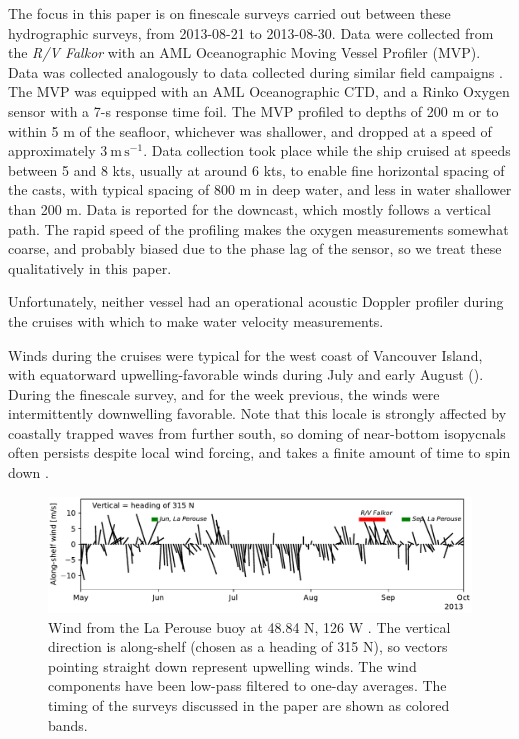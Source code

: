 \documentclass[draft]{agujournal2019}
\begin{document}
The focus in this paper is on finescale surveys carried out between these hydrographic surveys, from 2013-08-21 to 2013-08-30.  Data were collected from the \emph{R/V Falkor} with an AML Oceanographic Moving Vessel Profiler (MVP).  Data was collected analogously to data collected during similar field campaigns \cite{klymaketal15a, klymaketal16, dasaroetal18}. The MVP was equipped with an AML Oceanographic CTD, and a Rinko Oxygen sensor with a 7-s response time foil.  The MVP profiled to depths of 200 m or to within 5 m of the seafloor, whichever was shallower, and dropped at a speed of approximately $3\ \mathrm{m\,s^{-1}}$.  Data collection took place while the ship cruised at speeds between 5 and 8 kts, usually at around 6 kts, to enable fine horizontal spacing of the casts, with typical spacing  of 800 m in deep water, and less in water shallower than 200 m.  Data is reported for the downcast, which mostly follows a vertical path.  The rapid speed of the profiling makes the oxygen measurements somewhat coarse, and probably biased due to the phase lag of the sensor, so we treat these qualitatively in this paper.

Unfortunately, neither vessel had an operational acoustic Doppler profiler during the cruises with which to make water velocity measurements.

Winds during the cruises were typical for the west coast of Vancouver Island, with equatorward upwelling-favorable winds during July and early August ().  During the finescale survey, and for the week previous, the winds were intermittently downwelling favorable.  Note that this locale is strongly affected by coastally trapped waves from further south, so doming of near-bottom isopycnals often persists despite local wind forcing, and takes a finite amount of time to spin down \cite{thomsonkrassovski15, engidaetal16}.

\begin{figure}[htbp]
  \begin{center}
    \includegraphics[width=5.5in]{LaPeWind}
    \caption{
      Wind from the La Perouse buoy at 48.84 N, 126 W \cite{DFOWind2013C46206}.  The vertical direction is along-shelf (chosen as a heading of 315 N), so vectors pointing straight down represent upwelling winds.  The wind components have been low-pass filtered to one-day averages.  The timing of the surveys discussed in the paper are shown as colored bands.
      \label{fig:LaPeWind} }
  \end{center}
\end{figure}
\end{document}
